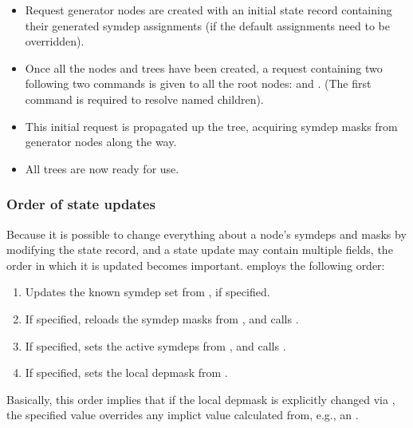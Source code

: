 \documentclass[10pt]{article}
\begin{document}
  \begin{itemize}
  
  \item Request generator nodes are created with an initial state record
    containing their generated symdep assignments (if the default assignments
    need to be overridden).
    
  \item Once all the nodes and trees have been created, a request containing
    two following two commands is given to all the root nodes:
     and . (The first command is
    required to resolve named children).
    
  \item This initial request is propagated up the tree, acquiring symdep masks
    from generator nodes along the way. 
    
  \item All trees are now ready for use.
  
  \end{itemize}

\subsubsection{Order of state updates}

  Because it is possible to change everything about a node's symdeps and masks
  by modifying the state record, and a state update may contain multiple
  fields, the order in which it is updated becomes important.
   employs the following order:

  \begin{enumerate}
  
  \item Updates the known symdep set from , if specified.
  
  \item If specified, reloads the symdep masks from , and
    calls .
    
  \item If specified, sets the active symdeps from , and
    calls .
    
  \item If specified, sets the local depmask from .
  
  \end{enumerate}
  
  Basically, this order implies that if the local depmask is explicitly changed
  via , the specified value overrides any implict value
  calculated from, e.g., an .
  
\end{document}
